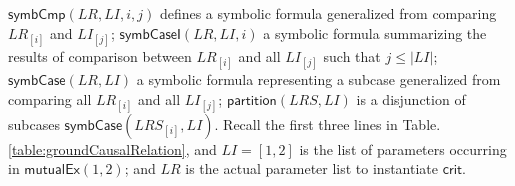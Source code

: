 \documentclass[final]{IEEEtran}
\def \iInv {iInv}
\def \iR {iR}
\begin{document}
$\mathsf{symbCmp}(LR,LI,i,j)$ defines a symbolic formula  generalized from comparing $LR_{[i]}$ and $LI_{[j]}$; $\mathsf{symbCaseI}(LR,LI,i)$  a symbolic formula summarizing the results of comparison  between $LR_{[i]}$  and all $LI_{[j]}$ such that $j \le |LI|$; $\mathsf{symbCase}(LR,LI )$ a symbolic formula representing a subcase generalized from comparing all $LR_{[i]}$  and all $LI_{[j]}$; $\mathsf{partition}(LRS,LI)$  is a disjunction of subcases $\mathsf{symbCase}(LRS_{[i]},LI )$.  Recall the first three lines in Table. \ref{table:groundCausalRelation}, and $LI=[1,2]$ is the list of parameters occurring in $\mathsf{mutualEx}(1,2)$; and $LR$ is the actual parameter list to instantiate $\mathsf{crit}$.

\end{document}
